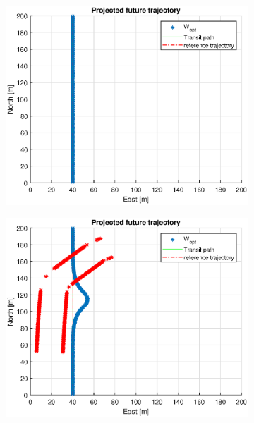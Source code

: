 \begin{figure} %
    \begin{subfigure}[b]{0.49\textwidth}
        \centering
        \includegraphics[width=\textwidth]{Images/Figures/sving_HO/Simple0_f999_Frame1}
    \end{subfigure}
    \hfill
    \begin{subfigure}[b]{0.499\textwidth}
        \centering
        \includegraphics[width=\textwidth]{Images/Figures/sving_HO/Simple0_f999_Frame2}

\end{subfigure}
\end{figure}
